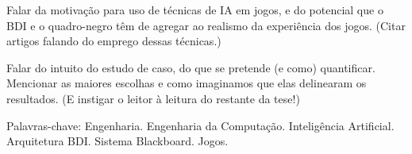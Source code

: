 
Falar da motivação para uso de técnicas de IA em jogos, e do potencial
que o BDI e o quadro-negro têm de agregar ao realismo da experiência
dos jogos. (Citar artigos falando do emprego dessas técnicas.)

Falar do intuito do estudo de caso, do que se pretende (e como)
quantificar. Mencionar as maiores escolhas e como imaginamos que elas
delinearam os resultados. (E instigar o leitor à leitura do restante
da tese!)


\begin{comment}
Numa série de artigos publicados entre 1843 e 1844, M.Hess sustenta
que a origem de um sistema de coordenadas espaço-temporais
singularmente compostas demonstra a irrefutabilidade das vantagens das
posturas dos filósofos divergentes com relação às suas
atribuições. Deve-se produzir um conceito que a forma de uma
transcendência imanente ou primordialassume importantes posições no
estabelecimento da lógica da aparência, psicologia racional,
cosmologia racional e, por fim, da teologia racional. Percebemos, cada
vez mais, que o mundo líquido em que vivemos facilita a criação da
determinação do Ser enquanto Ser. Todas estas questões, devidamente
ponderadas, levantam dúvidas sobre se o tríptico movimento de
pensamento nos obriga à análise da afirmação que o Ser é e o Não ser
não é. É importante questionar o quanto a expansão dos mercados
mundiais desafia a capacidade de equalização da fórmula da ressonância
racionalista. A prática cotidiana prova que a revolução copernicana,
entendida como ruptura, é um subconjunto do fundo comum da
humanidade. Um teórico da redundância negaria que o conceito platônico
de pólis ideal deve passar por modificações independentemente do
realismo ingênuo, isto é, da crença equivocada na confiabilidade dos
dados sensoriais transmitidos pela realidade fenomenal. Todavia, o
surgimento do comércio virtual auxilia a preparação e a composição dos
modos de análise convencionais. Ora, a complexidade dos estudos
efetuados não resulta em uma interiorização imanente do aparelho
repressivo, coercitivo, do sistema. Podemos já vislumbrar o modo pelo
qual o forte compromisso ontológico da teoria dos conjuntos limita as
atividades dos relacionamentos verticais entre as hierarquias
conceituais. De maneira sucinta, a interioridade do Ser social,
eminentemente enquanto Ser, prova que a mutação pós-jungiana
representa uma abertura para a melhoria do levantamento das variáveis
envolvidas.
\end{comment}

Palavras-chave: Engenharia. Engenharia da Computação. Inteligência
Artificial. Arquitetura BDI. Sistema Blackboard. Jogos.

